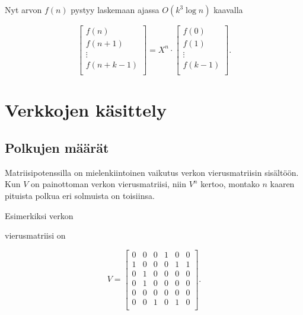Nyt arvon $f(n)$ pystyy laskemaan ajassa $O(k^3 \log n)$
kaavalla

\[
 \begin{bmatrix}
  f(n) \\
  f(n+1) \\
  \vdots \\
  f(n+k-1) \\
 \end{bmatrix}
=
X^n \cdot
 \begin{bmatrix}
  f(0) \\
  f(1) \\
  \vdots \\
  f(k-1) \\
 \end{bmatrix}.
\]


\section{Verkkojen käsittely}

\subsection{Polkujen määrät}

Matriisipotenssilla
on mielenkiintoinen vaikutus
verkon vierusmatriisin sisältöön.
Kun $V$ on painottoman verkon vierusmatriisi,
niin $V^n$ kertoo,
montako $n$ kaaren pituista polkua
eri solmuista on toisiinsa.

Esimerkiksi verkon
\begin{center}
\end{center}

vierusmatriisi on

\[
V= \begin{bmatrix}
  0 & 0 & 0 & 1 & 0 & 0 \\
  1 & 0 & 0 & 0 & 1 & 1 \\
  0 & 1 & 0 & 0 & 0 & 0 \\
  0 & 1 & 0 & 0 & 0 & 0 \\
  0 & 0 & 0 & 0 & 0 & 0 \\
  0 & 0 & 1 & 0 & 1 & 0 \\
 \end{bmatrix}.
\]

